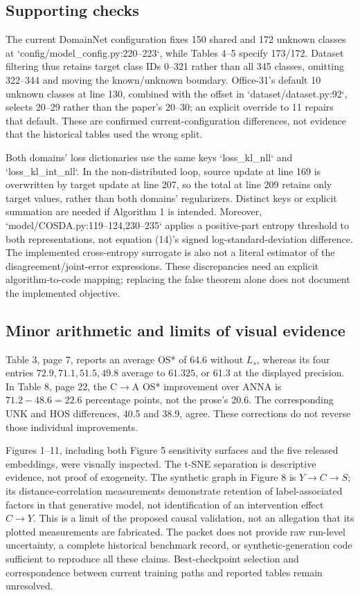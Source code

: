 \documentclass[10pt]{article}
\begin{document}
\subsection*{Supporting checks}
The current DomainNet configuration fixes 150 shared and 172 unknown classes at `config/model\_config.py:220--223`, while Tables 4–5 specify 173/172. Dataset filtering thus retains target class IDs 0–321 rather than all 345 classes, omitting 322–344 and moving the known/unknown boundary. Office-31’s default 10 unknown classes at line 130, combined with the offset in `dataset/dataset.py:92`, selects 20–29 rather than the paper’s 20–30; an explicit override to 11 repairs that default. These are confirmed current-configuration differences, not evidence that the historical tables used the wrong split.\par
Both domains’ loss dictionaries use the same keys `loss\_kl\_nll` and `loss\_kl\_int\_nll`. In the non-distributed loop, source update at line 169 is overwritten by target update at line 207, so the total at line 209 retains only target values, rather than both domains’ regularizers. Distinct keys or explicit summation are needed if Algorithm 1 is intended. Moreover, `model/COSDA.py:119--124,230--235` applies a positive-part entropy threshold to both representations, not equation (14)’s signed log-standard-deviation difference. The implemented cross-entropy surrogate is also not a literal estimator of the disagreement/joint-error expressions. These discrepancies need an explicit algorithm-to-code mapping; replacing the false theorem alone does not document the implemented objective.\par
\subsection*{Minor arithmetic and limits of visual evidence}
Table 3, page 7, reports an average OS* of 64.6 without \(L_s\), whereas its four entries \(72.9,71.1,51.5,49.8\) average to \(61.325\), or 61.3 at the displayed precision. In Table 8, page 22, the C\(\to\)A OS* improvement over ANNA is \(71.2-48.6=22.6\) percentage points, not the prose’s 20.6. The corresponding UNK and HOS differences, 40.5 and 38.9, agree. These corrections do not reverse those individual improvements.\par
Figures 1–11, including both Figure 5 sensitivity surfaces and the five released embeddings, were visually inspected. The t-SNE separation is descriptive evidence, not proof of exogeneity. The synthetic graph in Figure 8 is \(Y\to C\to S\); its distance-correlation measurements demonstrate retention of label-associated factors in that generative model, not identification of an intervention effect \(C\to Y\). This is a limit of the proposed causal validation, not an allegation that its plotted measurements are fabricated. The packet does not provide raw run-level uncertainty, a complete historical benchmark record, or synthetic-generation code sufficient to reproduce all these claims. Best-checkpoint selection and correspondence between current training paths and reported tables remain unresolved.\par
\end{document}

